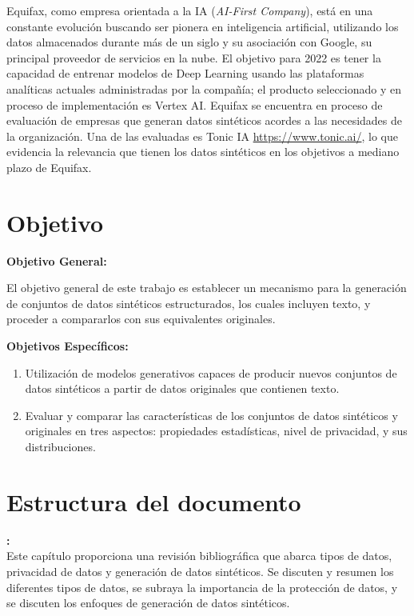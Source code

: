 Equifax, como empresa orientada a la IA (\emph{AI-First Company}), está en una constante evolución buscando ser pionera en inteligencia artificial, utilizando los datos almacenados durante más de un siglo y su asociación con Google, su principal proveedor de servicios en la nube. El objetivo para 2022 es tener la capacidad de entrenar modelos de Deep Learning usando las plataformas analíticas actuales administradas por la compañía; el producto seleccionado y en proceso de implementación es Vertex AI. Equifax se encuentra en proceso de evaluación de empresas que generan datos sintéticos acordes a las necesidades de la organización. Una de las evaluadas es Tonic IA \url{https://www.tonic.ai/}, lo que evidencia la relevancia que tienen los datos sintéticos en los objetivos a mediano plazo de Equifax.

\newpage
\section{Objetivo}

\textbf{Objetivo General:}

El objetivo general de este trabajo es establecer un mecanismo para la generación de conjuntos de datos sintéticos estructurados, los cuales incluyen texto, y proceder a compararlos con sus equivalentes originales.

\textbf{Objetivos Específicos:}
\begin{enumerate}
    \item Utilización de modelos generativos capaces de producir nuevos conjuntos de datos sintéticos a partir de datos originales que contienen texto.
    \item Evaluar y comparar las características de los conjuntos de datos sintéticos y originales en tres aspectos: propiedades estadísticas, nivel de privacidad, y sus distribuciones.
\end{enumerate}

\section{Estructura del documento}

\textbf{:}  \\
Este capítulo proporciona una revisión bibliográfica que abarca tipos de datos, privacidad de datos y generación de datos sintéticos. Se discuten y resumen los diferentes tipos de datos, se subraya la importancia de la protección de datos, y se discuten los enfoques de generación de datos sintéticos.

